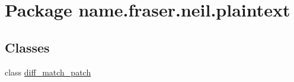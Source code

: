 \hypertarget{namespacename_1_1fraser_1_1neil_1_1plaintext}{}\section{Package name.\+fraser.\+neil.\+plaintext}
\label{namespacename_1_1fraser_1_1neil_1_1plaintext}
\subsection*{Classes}
\begin{DoxyCompactItemize}
\item 
class \hyperlink{classname_1_1fraser_1_1neil_1_1plaintext_1_1diff__match__patch}{diff\+\_\+match\+\_\+patch}
\end{DoxyCompactItemize}
